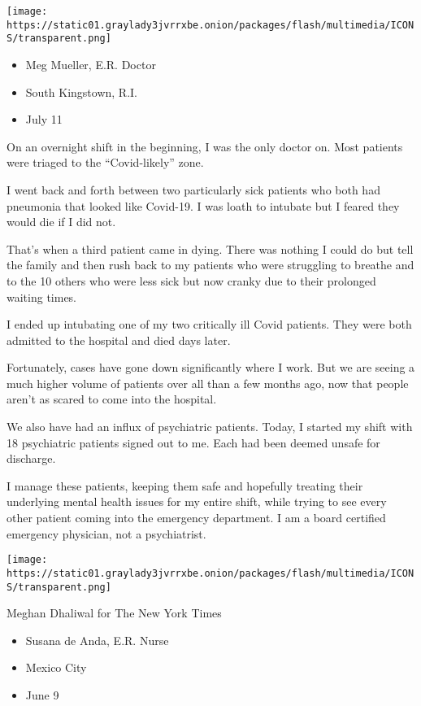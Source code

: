\texttt{[image: https://static01.graylady3jvrrxbe.onion/packages/flash/multimedia/ICONS/transparent.png]}

\begin{itemize}
\tightlist
\item
  Meg Mueller, E.R. Doctor
\item
  South Kingstown, R.I.
\item
  July 11
\end{itemize}

On an overnight shift in the beginning, I was the only doctor on. Most
patients were triaged to the ``Covid-likely'' zone.

I went back and forth between two particularly sick patients who both
had pneumonia that looked like Covid-19. I was loath to intubate but I
feared they would die if I did not.

That's when a third patient came in dying. There was nothing I could do
but tell the family and then rush back to my patients who were
struggling to breathe and to the 10 others who were less sick but now
cranky due to their prolonged waiting times.

I ended up intubating one of my two critically ill Covid patients. They
were both admitted to the hospital and died days later.

Fortunately, cases have gone down significantly where I work. But we are
seeing a much higher volume of patients over all than a few months ago,
now that people aren't as scared to come into the hospital.

We also have had an influx of psychiatric patients. Today, I started my
shift with 18 psychiatric patients signed out to me. Each had been
deemed unsafe for discharge.

I manage these patients, keeping them safe and hopefully treating their
underlying mental health issues for my entire shift, while trying to see
every other patient coming into the emergency department. I am a board
certified emergency physician, not a psychiatrist.

\texttt{[image: https://static01.graylady3jvrrxbe.onion/packages/flash/multimedia/ICONS/transparent.png]}

Meghan Dhaliwal for The New York Times

\begin{itemize}
\tightlist
\item
  Susana de Anda, E.R. Nurse
\item
  Mexico City
\item
  June 9
\end{itemize}

